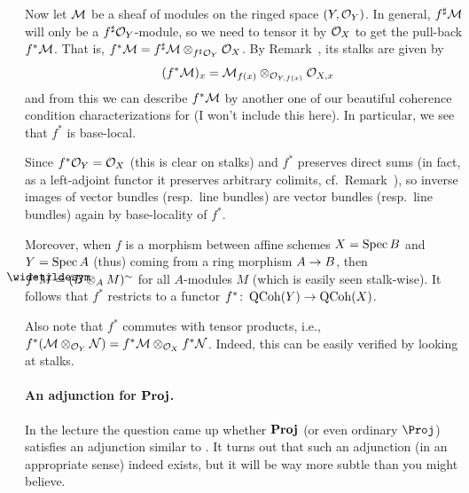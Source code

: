 \documentclass[a4paper,parskip=half,numbers=enddot, DIV=12]{scrreprt}
\begin{document}
\begin{rem}
\begin{alphanumerate}
		Now let $\mathcal{M}$ be a sheaf of modules on the ringed space $(Y,\mathcal{O}_Y)$. In general, $f^\sharp \mathcal{M}$ will only be a $f^\sharp\mathcal{O}_Y$-module, so we need to tensor it by $\mathcal{O}_X$ to get the pull-back $f^*\mathcal{M}$. That is, $f^*\mathcal{M}=f^\sharp\mathcal{M}\otimes_{f^\sharp\mathcal{O}_Y}\mathcal{O}_X$. By Remark~, its stalks are given by
		\begin{align*}
		(f^*\mathcal{M})_x=\mathcal{M}_{f(x)}\otimes_{\mathcal{O}_{Y,f(x)}}\mathcal{O}_{X,x}
		\end{align*}
		and from this we can describe $f^*\mathcal{M}$ by another one of our beautiful coherence condition characterizations for (I won't include this here). In particular, we see that $f^*$ is base-local.
		\item Since $f^*\mathcal{O}_Y=\mathcal{O}_X$ (this is clear on stalks) and $f^*$ preserves direct sums (in fact, as a left-adjoint functor it preserves arbitrary colimits, cf.\ Remark~), so inverse images of vector bundles (resp.\ line bundles) are vector bundles (resp.\ line bundles) again by base-locality of $f^*$.
		\item Moreover, when $f$ is a morphism between affine schemes $X=\operatorname{Spec} B$ and $Y=\operatorname{Spec} A$ (thus) coming from a ring morphism $A\morphism B$, then $f^*\snake{M}=(B\otimes_AM)^\sim$ for all $A$-modules $M$ (which is easily seen stalk-wise). It follows that $f^*$ restricts to a functor $f^*\colon \cat{QCoh}(Y)\morphism\cat{QCoh}(X)$.
		\item Also note that $f^*$ commutes with tensor products, i.e., $f^*(\mathcal{M}\otimes_{\mathcal{O}_Y}\mathcal{N})=f^*\mathcal{M}\otimes_{\mathcal{O}_X}f^*\mathcal{N}$. Indeed, this can be easily verified by looking at stalks.
	\end{alphanumerate}
\end{rem}
\paragraph{An adjunction for $\operatorname{\mathbf{Proj}}$.} In the lecture the question came up whether $\operatorname{\mathbf{Proj}}$ (or even ordinary $\Proj$) satisfies an adjunction similar to . It turns out that such an adjunction (in an appropriate sense) indeed exists, but it will be way more subtle than you might believe.
\end{document}
